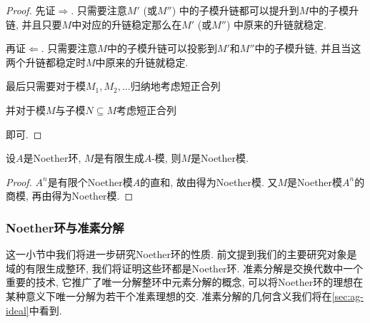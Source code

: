 \begin{proof}
  先证$\Rightarrow$. 只需要注意$M'$ (或$M''$) 中的子模升链都可以提升到$M$中的子模升链, 并且只要$M$中对应的升链稳定那么在$M'$ (或$M''$) 中原来的升链就稳定.

  再证$\Leftarrow$. 只需要注意$M$中的子模升链可以投影到$M'$和$M''$中的子模升链, 并且当这两个升链都稳定时$M$中原来的升链就稳定.

  最后只需要对于模$M_1, M_2, \dotsc$归纳地考虑短正合列
  并对于模$M$与子模$N\subseteq M$考虑短正合列
  即可.
\end{proof}

\begin{proposition}\label{prop:fgmoduleovernoetherring}
  设$A$是Noether环, $M$是有限生成$A$-模, 则$M$是Noether模.
\end{proposition}

\begin{proof}
  $A^n$是有限个Noether模$A$的直和, 故由得为Noether模. 又$M$是Noether模$A^n$的商模, 再由得为Noether模.
\end{proof}

\subsubsection{Noether环与准素分解}\label{sec:algebra-primdecom}

这一小节中我们将进一步研究Noether环的性质. 前文提到我们的主要研究对象是域的有限生成整环, 我们将证明这些环都是Noether环. 准素分解是交换代数中一个重要的技术, 它推广了唯一分解整环中元素分解的概念, 可以将Noether环的理想在某种意义下唯一分解为若干个准素理想的交. 准素分解的几何含义我们将在\ref{sec:ag-ideal}中看到.


